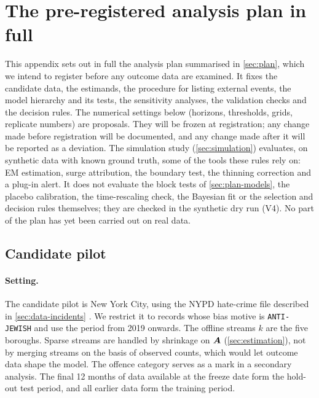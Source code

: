 \section{The pre-registered analysis plan in full}\label{app:plan}

This appendix sets out in full the analysis plan summarised in \cref{sec:plan}, which we
intend to register before any outcome data are examined. It fixes the candidate data, the
estimands, the procedure for listing external events, the model hierarchy and its tests,
the sensitivity analyses, the validation checks and the decision rules. The numerical
settings below (horizons, thresholds, grids, replicate numbers) are proposals. They will be
frozen at registration; any change made before registration will be documented, and any
change made after it will be reported as a deviation. The simulation study
(\cref{sec:simulation}) evaluates, on synthetic data with known ground truth, some of the
tools these rules rely on: EM estimation, surge attribution, the boundary test, the
thinning correction and a plug-in alert. It does not evaluate the block tests of
\cref{sec:plan-models}, the placebo calibration, the time-rescaling check, the Bayesian fit
or the selection and decision rules themselves; they are checked in the synthetic dry run
(V4). No part of the plan has yet been carried out on real data.

\subsection{Candidate pilot}\label{sec:plan-pilot}

\paragraph{Setting.}
The candidate pilot is New York City, using the NYPD hate-crime file
described in \cref{sec:data-incidents} \citep{nypdhate}. We restrict it
to records whose bias motive is \texttt{ANTI-JEWISH} and use the period from
2019 onwards. The offline streams $k$ are the five boroughs. Sparse streams
are handled by shrinkage on $\bm{A}$ (\cref{sec:estimation}), not by merging
streams on the basis of observed counts, which would let outcome data shape
the model. The offence category serves as a mark in a secondary analysis.
The final 12 months of data available at the freeze date form the hold-out
test period, and all earlier data form the training period.

